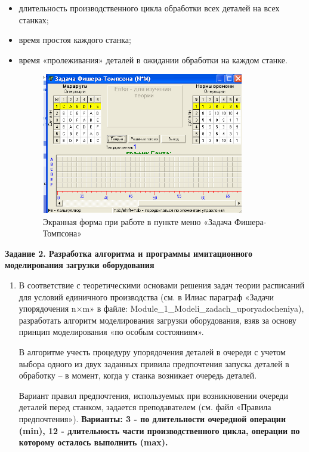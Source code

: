 \documentclass[a4paper,12pt]{article}
\begin{document}
\begin{flushleft}
\begin{enumerate}
\begin{itemize}
\item
  длительность производственного цикла обработки всех деталей на всех
  станках;
\item
  время простоя каждого станка;
\item
  время «пролеживания» деталей в ожидании обработки на каждом станке. 
\begin{flushleft}\end{flushleft}
\begin{figure}
    \includegraphics[width=8.832cm,height=6.156cm]{pic_1.png}
    \centering
    \caption{\small{Экранная форма при работе в пункте меню «Задача
    Фишера-Томпсона»}}
\end{figure}
\end{itemize}
\end{enumerate}
\raggedright
\textbf{Задание 2. Разработка алгоритма и программы имитационного
моделирования загрузки оборудования }
\justify
\begin{enumerate}
\item
  В соответствие с теоретическими основами решения задач теории
  расписаний для условий единичного производства (см. в Илиас параграф
  «Задачи упорядочения n$\times$m» в файле:
  Module\_1\_Modeli\_zadach\_uporyadocheniya), разработать алгоритм
  моделирования загрузки оборудования, взяв за основу принцип
  моделирования «по особым состояниям». 

  В алгоритме учесть процедуру упорядочения деталей в очереди с учетом
  выбора одного из двух заданных привила предпочтения запуска деталей в
  обработку -- в момент, когда у станка возникает очередь деталей.

  Вариант правил предпочтения, используемых при возникновении очереди
  деталей перед станком, задается преподавателем (см. файл «Правила
  предпочтения»). \textbf{Варианты: 3 - по длительности очередной операции (min), 12 - длительность части производственного цикла, операции по которому осталось выполнить (max).}


\end{enumerate}
\end{flushleft}
\end{document}

